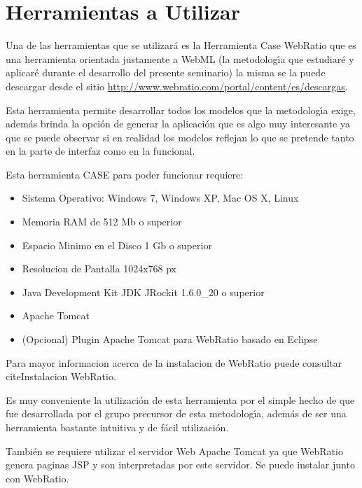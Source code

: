 \chapter{Herramientas a Utilizar}

Una de las herramientas que se utilizar\'a es la Herramienta Case WebRatio que 
es una  herramienta  orientada  justamente  a  WebML (la  metodolog\'{\i}a  que  
estudiar\'e  y aplicar\'e durante el desarrollo del presente seminario) la 
misma se la puede descargar desde el sitio 
\url{http://www.webratio.com/portal/content/es/descargas}. 

Esta herramienta permite desarrollar todos los modelos que la metodolog\'{\i}a 
exige, adem\'as brinda la opci\'on de generar la aplicaci\'on que es algo muy 
interesante ya que se puede observar si en realidad los modelos reflejan lo 
que se pretende tanto en la parte de interfaz como en la funcional. 


Esta  herramienta  CASE para poder funcionar requiere:  

\begin{itemize}
    \item Sistema Operativo: Windows 7, Windows XP, Mac OS X, Linux
    \item Memoria RAM de 512 Mb o superior
    \item Espacio Minimo en el Disco 1 Gb o superior
    \item Resolucion de Pantalla 1024x768 px 
    \item Java Development Kit JDK JRockit 1.6.0\_20 o superior
    \item Apache Tomcat
    \item (Opcional) Plugin Apache Tomcat para WebRatio basado en Eclipse 
\end{itemize}


Para mayor informacion acerca de la instalacion de WebRatio puede consultar 
cite{Instalacion WebRatio}.


Es muy conveniente la utilizaci\'on de esta herramienta por el simple hecho de 
que fue  desarrollada  por  el  grupo  precursor  de  esta  metodolog\'{\i}a,  
adem\'as  de  ser  una herramienta bastante intuitiva y de f\'acil 
utilizaci\'on. 


Tambi\'en se requiere utilizar el servidor Web  Apache Tomcat ya que WebRatio 
genera paginas JSP y son interpretadas por este servidor. Se puede instalar
junto con WebRatio. 
